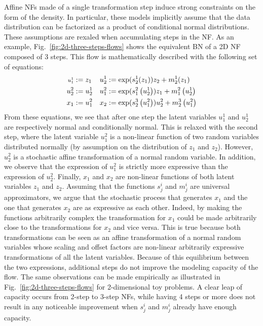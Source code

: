 \documentclass{article}
\newcommand{\figref}[1]{Fig.~\ref{#1}}
\begin{document}
Affine NFs made of a single transformation step induce strong constraints on the form of the density. In particular, these models implicitly assume that the data distribution can be factorized as a product of conditional normal distributions. 
These assumptions are rexaled when accumulating steps in the NF.
As an example, \figref{fig:2d-three-steps-flows} shows the equivalent BN of a 2D NF composed of 3 steps. This flow is mathematically described with the following set of equations:
\begin{align*}
\vspace{-5em}
\scriptstyle
    u_1^1 &:= z_1  & u_2^1 &:= \exp(s^1_2(z_1))z_2 + m_2^1(z_1) \\
    u_2^2 &:= u_2^1 & u_1^2 &:= \exp(s^2_1\left(u_2^1\right))z_1 + m^2_1\left(u_2^1\right)  \\%
    x_1 &:=  u_1^2 & %
    x_2 &:= \exp(s_2^3\left(u_1^2\right))u^2_2 + m^3_2\left( u_1^2 \right)
\end{align*} 
From these equations, we see that after one step the latent variables $u^1_1$ and $u_2^1$ are respectively normal and conditionally normal. 
This is relaxed with the second step, where the latent variable $u^2_1$ is a non-linear function of two random variables distributed normally (by assumption on the distribution of $z_1$ and $z_2$). 
However, $u_2
^2$ is a stochastic affine transformation of a normal random variable. 
In addition, we observe that the expression of $u^2_1$ is strictly more expressive than the expression of $u^2_2$. 
Finally, $x_1$ and $x_2$ are non-linear functions of both latent variables $z_1$ and $z_2$. 
Assuming that the functions $s^i_j$ and $m^i_j$ are universal approximators, we argue that the stochastic process that generates $x_1$ and the one that generates $x_2$ are as expressive as each other. 
Indeed, by making the functions arbitrarily complex the transformation for $x_1$ could be made arbitrarily close to the transformations for $x_2$ and vice versa. 
This is true because both transformations can be seen as an affine transformation of a normal random variables whose scaling and offset factors are non-linear arbitrarily expressive transformations of all the latent variables. Because of this equilibrium between the two expressions, additional steps do not improve the modeling capacity of the flow.
The same observations can be made empirically as illustrated in \figref{fig:2d-three-steps-flows} for 2-dimensional toy problems. A clear leap of capacity occurs from 2-step to 3-step NFs, while having 4 steps or more does not result in any noticeable improvement when $s^i_j$ and $m^i_j$ already have enough capacity.
\end{document}
